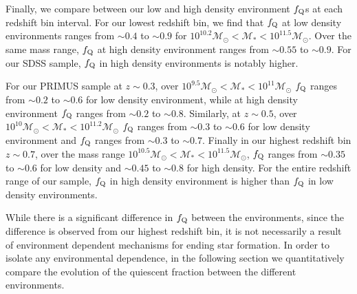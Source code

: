 \documentclass{emulateapj}
\begin{document}

Finally, we compare between our low and high density environment
$f_{\rm{Q}}$s at each redshift bin interval. For our lowest redshift
bin, we find that $f_{\rm{Q}}$ at low density environments ranges from
$\sim 0.4$ to $\sim 0.9$ for $10^{10.2} \mathcal{M}_{\odot} <
\mathcal{M}_{*} < 10^{11.5} \mathcal{M}_{\odot}$. Over the same mass
range, $f_{\rm{Q}}$ at high density environment ranges from $\sim
0.55$ to $\sim 0.9$. For our SDSS sample, $f_{\rm{Q}}$ in
high density environments is notably higher. 

For our PRIMUS sample at $z \sim 0.3$, over $10^{9.5} \mathcal{M}_{\odot} < \mathcal{M}_{*} < 10^{11} \mathcal{M}_{\odot}$ $f_{\rm{Q}}$ ranges from $\sim 0.2$ to $\sim 0.6$ for low density environment, while at high density environment $f_{\rm{Q}}$ ranges from $\sim 0.2$ to $\sim 0.8$. Similarly, at $z \sim 0.5$, over $10^{10} \mathcal{M}_{\odot} < \mathcal{M}_{*} < 10^{11.2} \mathcal{M}_{\odot}$ $f_{\rm{Q}}$ ranges from $\sim 0.3$ to $\sim 0.6$ for low density environment and $f_{\rm{Q}}$ ranges from $\sim 0.3$ to $\sim 0.7$. Finally in our highest redshift bin $z \sim 0.7$, over the mass range $10^{10.5} \mathcal{M}_{\odot} < \mathcal{M}_{*} < 10^{11.5} \mathcal{M}_{\odot}$, $f_{\rm{Q}}$ ranges from $\sim 0.35$ to $\sim 0.6$ for low density and $\sim 0.45$ to $\sim 0.8$ for high density. For the entire redshift range of our sample, $f_{\rm{Q}}$ in high density environment is higher than $f_{\rm{Q}}$ in low density environments. 

While there is a significant difference in $f_{\rm{Q}}$ between the
environments, since the difference is observed from our highest
redshift bin, it is not necessarily a result of environment dependent
mechanisms for ending star formation. In order to isolate any
environmental dependence, in the following section we quantitatively
compare the evolution of the quiescent fraction between the different
environments.
\end{document}
